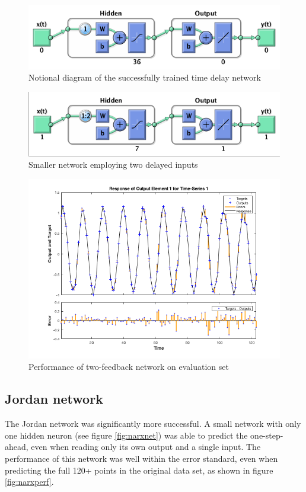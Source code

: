\documentclass{IEEEtran}
\begin{document}
\begin{figure}[ht]
    \centering
    \includegraphics[width=\linewidth]{timedelay/diagram}
    \caption{Notional diagram of the successfully trained time delay network \label{fig:tdarch}}
\end{figure}

\begin{figure}[ht]
    \centering
    \includegraphics[width=\linewidth]{timedelay/better_tdnn}
    \caption{Smaller network employing two delayed inputs \label{fig:bettertd}}
\end{figure}

\begin{figure}[ht]
    \centering
    \includegraphics[width=\linewidth]{timedelay/tdnn_more_feedback_perf}
    \caption{Performance of two-feedback network on evaluation set \label{fig:tdperf}}
\end{figure}

\subsection{Jordan network \label{sn:jordan}}
The Jordan network was significantly more successful. A small network with only one hidden neuron (see figure \ref{fig:narxnet}) was able to predict the one-step-ahead, even when reading only its own output and a single input. The performance of this network was well within the error standard, even when predicting the full 120+ points in the original data set, as shown in figure \ref{fig:narxperf}.
\end{document}
